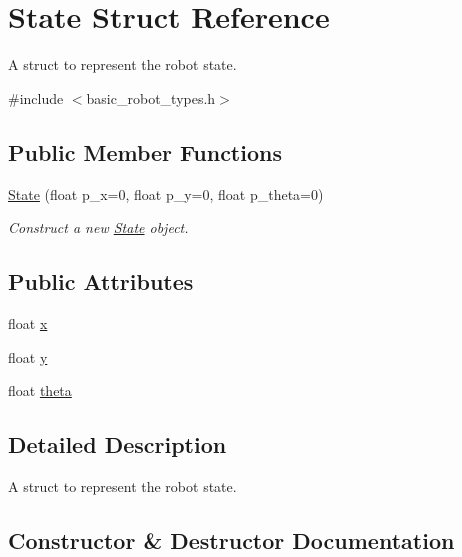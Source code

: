 \hypertarget{structState}{}\section{State Struct Reference}
\label{structState}


A struct to represent the robot state.  




{\ttfamily \#include $<$basic\+\_\+robot\+\_\+types.\+h$>$}

\subsection*{Public Member Functions}
\begin{DoxyCompactItemize}
\item 
\hyperlink{structState_afb4608f4a1686ab31d14af3118d702e4}{State} (float p\+\_\+x=0, float p\+\_\+y=0, float p\+\_\+theta=0)
\begin{DoxyCompactList}\small\item\em Construct a new \hyperlink{structState}{State} object. \end{DoxyCompactList}\end{DoxyCompactItemize}
\subsection*{Public Attributes}
\begin{DoxyCompactItemize}
\item 
float \hyperlink{structState_a9948cc668f49246582cfd131b7928f7e}{x}
\item 
float \hyperlink{structState_a89572abb38dea3b1a780ede589a2d59b}{y}
\item 
float \hyperlink{structState_a30afc89f484d7de62a17809c2a70a410}{theta}
\end{DoxyCompactItemize}


\subsection{Detailed Description}
A struct to represent the robot state. 

\subsection{Constructor \& Destructor Documentation}
\mbox{\label{structState_afb4608f4a1686ab31d14af3118d702e4}} 
